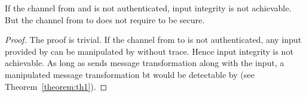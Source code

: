 \begin{theorem}
\label{theorem:th2}
If the channel from \user and \server is not authenticated, input integrity is not achievable. But the channel from \server to \user does not require to be secure.
\end{theorem}

\begin{proof}
The proof is trivial. If the channel from \user to \server is not authenticated, any input provided by \user can be manipulated by \host without trace. Hence input integrity is not achievable. As long as \user sends message transformation along with the input, a manipulated message transformation bt \host would be detectable by \server (see Theorem~\ref{theorem:th1}).
\end{proof}


\iffalse
\subsection{Protection against phishing attacks}
\subsection{Keyboard Manipulation Attacks and Defenses}
\subsubsection{Change user selected values}


\subsection{Mouse Manipulation Attacks and Defenses}
\subsubsection{Changing mouse position}
Changing the mouse position can be detected by the device as the device expects to find it in the location that the user provides. 
\subsubsection{Removing the mouse completely}
This is detectable by the \device as the \device no longer finds the mouse pointer in the screen at the designated position.  
\subsubsection{Add mouse cursor to confuse users}

\subsection{UI Manipulation Attacks and Defenses}
\subsubsection{Manipulate the position of the UI elements on the screen}
\fi